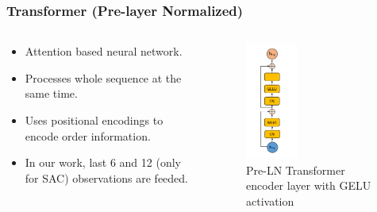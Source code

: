 \documentclass{beamer}
\begin{document}
\begin{frame}
\frametitle{Transformer (Pre-layer Normalized)}
\begin{columns}[onlytextwidth]
	\begin{column}{.49\textwidth}
		\begin{itemize}
			\item Attention based neural network.
			\item Processes whole sequence at the same time.
			\item Uses positional encodings to encode order information.
			\item In our work, last 6 and 12 (only for SAC) observations are feeded. 			
		\end{itemize}
	\end{column}
	\begin{column}{.49\textwidth}
		\begin{figure}
			\centering
			\includegraphics[width=0.4\textwidth]{figures/ml_theory/transformer_block.png}
			\caption{Pre-LN Transformer encoder layer with GELU activation}
			\label{fig:pre_trsf}
		\end{figure}
	\end{column}
\end{columns}
\end{frame}

\end{document}
